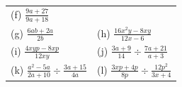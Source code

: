 \begin{enumerate}[noitemsep, label=\textbf{\arabic*}. ]
{{\begin{center}
\begin{tabular}[t]{|l|l|}
        (f) $\frac{9a+27}{9a+18}$\hspace{1ex}%
     \tabularnewline\cline{1-1}\cline{2-2}
        (g) $\frac{6ab+2a}{2b}$\hspace{1ex} &
        (h) $\frac{16{x}^{2}y-8xy}{12x-6}$\hspace{1ex}%
     \tabularnewline\cline{1-1}\cline{2-2}
        (i) $\frac{4xyp-8xp}{12xy}$\hspace{1ex} &
        (j) $\frac{3a+9}{14}÷\frac{7a+21}{a+3}$\hspace{1ex}%
     \tabularnewline\cline{1-1}\cline{2-2}
        (k) $\frac{{a}^{2}-5a}{2a+10}÷\frac{3a+15}{4a}$\hspace{1ex} &
        (l) $\frac{3xp+4p}{8p}÷\frac{12{p}^{2}}{3x+4}$\hspace{1ex}%
     \tabularnewline\cline{1-1}\cline{2-2}

\end{tabular}
\end{center}}}
\end{enumerate}
